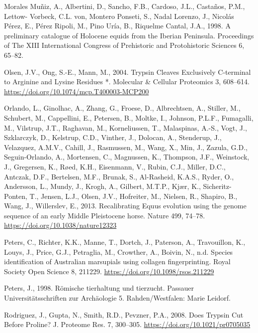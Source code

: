 \documentclass[preprint, 3p, authoryear]{elsarticle} %
\newlength{\cslhangindent}
\newlength{\cslentryspacingunit} %
\newenvironment{CSLReferences}[2] %
 {%
  \setlength{\parindent}{0pt}
  \ifodd #1
  \let\oldpar\par
  \def\par{\hangindent=\cslhangindent\oldpar}
  \fi
  \setlength{\parskip}{#2\cslentryspacingunit}
 }%
 {}
\begin{document}
\begin{CSLReferences}{1}{0}
\leavevmode{}%
Morales Muñiz, A., Albertini, D., Sancho, F.B., Cardoso, J.L., Castaños, P.M., Lettow- Vorbeck, C.L. von, Montero Ponseti, S., Nadal Lorenzo, J., Nicolás Pérez, E., Pérez Ripoli, M., Pino Uría, B., Riquelme Cantal, J.A., 1998. A preliminary catalogue of {Holocene} equids from the {Iberian Peninsula}. Proceedings of The XIII International Congress of Prehistoric and Protohistoric Sciences 6, 65--82.

\leavevmode{}%
Olsen, J.V., Ong, S.-E., Mann, M., 2004. Trypsin {Cleaves Exclusively C-terminal} to {Arginine} and {Lysine Residues} *. Molecular \& Cellular Proteomics 3, 608--614. \url{https://doi.org/10.1074/mcp.T400003-MCP200}

\leavevmode{}%
Orlando, L., Ginolhac, A., Zhang, G., Froese, D., Albrechtsen, A., Stiller, M., Schubert, M., Cappellini, E., Petersen, B., Moltke, I., Johnson, P.L.F., Fumagalli, M., Vilstrup, J.T., Raghavan, M., Korneliussen, T., Malaspinas, A.-S., Vogt, J., Szklarczyk, D., Kelstrup, C.D., Vinther, J., Dolocan, A., Stenderup, J., Velazquez, A.M.V., Cahill, J., Rasmussen, M., Wang, X., Min, J., Zazula, G.D., Seguin-Orlando, A., Mortensen, C., Magnussen, K., Thompson, J.F., Weinstock, J., Gregersen, K., Røed, K.H., Eisenmann, V., Rubin, C.J., Miller, D.C., Antczak, D.F., Bertelsen, M.F., Brunak, S., Al-Rasheid, K.A.S., Ryder, O., Andersson, L., Mundy, J., Krogh, A., Gilbert, M.T.P., Kjær, K., Sicheritz-Ponten, T., Jensen, L.J., Olsen, J.V., Hofreiter, M., Nielsen, R., Shapiro, B., Wang, J., Willerslev, E., 2013. Recalibrating {Equus} evolution using the genome sequence of an early {Middle Pleistocene} horse. Nature 499, 74--78. \url{https://doi.org/10.1038/nature12323}

\leavevmode{}%
Peters, C., Richter, K.K., Manne, T., Dortch, J., Paterson, A., Travouillon, K., Louys, J., Price, G.J., Petraglia, M., Crowther, A., Boivin, N., n.d. Species identification of {Australian} marsupials using collagen fingerprinting. Royal Society Open Science 8, 211229. \url{https://doi.org/10.1098/rsos.211229}

\leavevmode{}%
Peters, J., 1998. Römische tierhaltung und tierzucht. {Passauer Universitätsschriften} zur {Archäologie} 5. Rahden/Westfalen: Marie Leidorf.

\leavevmode{}%
Rodriguez, J., Gupta, N., Smith, R.D., Pevzner, P.A., 2008. Does {Trypsin Cut Before Proline}? J. Proteome Res. 7, 300--305. \url{https://doi.org/10.1021/pr0705035}


\end{CSLReferences}
\end{document}
